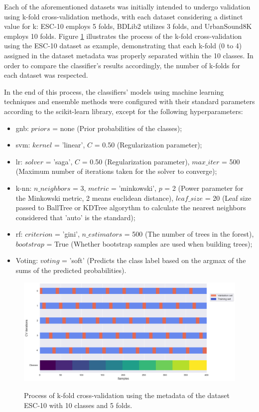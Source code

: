 Each of the aforementioned datasets was initially intended to undergo validation using k-fold cross-validation methods, with each dataset considering a distinct value for k: ESC-10 employs 5 folds, BDLib2 utilizes 3 folds, and UrbanSound8K employs 10 folds. Figure \ref{fig:methods_training_k-fold} illustrates the process of the k-fold cross-validation using the ESC-10 dataset as example, demonstrating that each k-fold (0 to 4) assigned in the dataset metadata was properly separated within the 10 classes. In order to compare the classifier's results accordingly, the number of k-folds for each dataset was respected.

In the end of this process, the classifiers' models using machine learning techniques and ensemble methods were configured with their standard parameters according to the scikit-learn library, except for the following hyperparameters:

\begin{itemize}
    \item \gls{gnb}: $ priors$ = none (Prior probabilities of the classes);
    \item \gls{svm}: $kernel$ = 'linear', $C$ = 0.50 (Regularization parameter);
    \item \gls{lr}: $solver$ = 'saga', $C$ = 0.50 (Regularization parameter), $max\_iter$ = 500 (Maximum number of iterations taken for the solver to converge);
    \item \gls{k-nn}: $n\_neighbors$ = 3, $metric$ = 'minkowski', $p$ = 2 (Power parameter for the Minkowski metric, 2 means euclidean distance), $leaf\_size$ = 20 (Leaf size passed to BallTree or KDTree algorythm to calculate the nearest neighbors considered that 'auto' is the standard);
    \item \gls{rf}: $criterion$ = 'gini', $n\_estimators$ = 500 (The number of trees in the forest), $bootstrap$ = True (Whether bootstrap samples are used when building trees);
    \item Voting: $voting$ = 'soft' (Predicts the class label based on the argmax of the sums of the predicted probabilities).
\end{itemize}

\begin{figure}[htbp]
    \raggedright
        \caption{Process of k-fold cross-validation using the metadata of the dataset ESC-10 with 10 classes and 5 folds.}
        \includegraphics[width=1\textwidth]{resources/images/050-methods/Methods_training_k-fold.png}
        \label{fig:methods_training_k-fold}
\end{figure}

